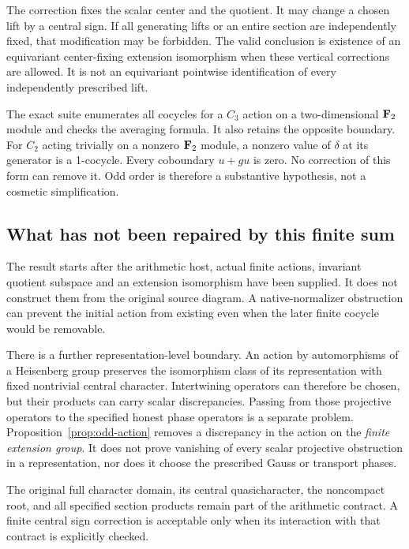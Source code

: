 The correction fixes the scalar center and the quotient. It may change a chosen lift by a central sign. If all generating lifts or an entire section are independently fixed, that modification may be forbidden. The valid conclusion is existence of an equivariant center-fixing extension isomorphism when these vertical corrections are allowed. It is not an equivariant pointwise identification of every independently prescribed lift.

The exact suite enumerates all cocycles for a $C_3$ action on a two-dimensional $\mathbf F_2$ module and checks the averaging formula. It also retains the opposite boundary. For $C_2$ acting trivially on a nonzero $\mathbf F_2$ module, a nonzero value of $\delta$ at its generator is a 1-cocycle. Every coboundary $u+gu$ is zero. No correction of this form can remove it. Odd order is therefore a substantive hypothesis, not a cosmetic simplification.

\subsection{What has not been repaired by this finite sum}
The result starts after the arithmetic host, actual finite actions, invariant quotient subspace and an extension isomorphism have been supplied. It does not construct them from the original source diagram. A native-normalizer obstruction can prevent the initial action from existing even when the later finite cocycle would be removable.

There is a further representation-level boundary. An action by automorphisms of a Heisenberg group preserves the isomorphism class of its representation with fixed nontrivial central character. Intertwining operators can therefore be chosen, but their products can carry scalar discrepancies. Passing from those projective operators to the specified honest phase operators is a separate problem. Proposition~\ref{prop:odd-action} removes a discrepancy in the action on the \emph{finite extension group}. It does not prove vanishing of every scalar projective obstruction in a representation, nor does it choose the prescribed Gauss or transport phases.

The original full character domain, its central quasicharacter, the noncompact root, and all specified section products remain part of the arithmetic contract. A finite central sign correction is acceptable only when its interaction with that contract is explicitly checked.

